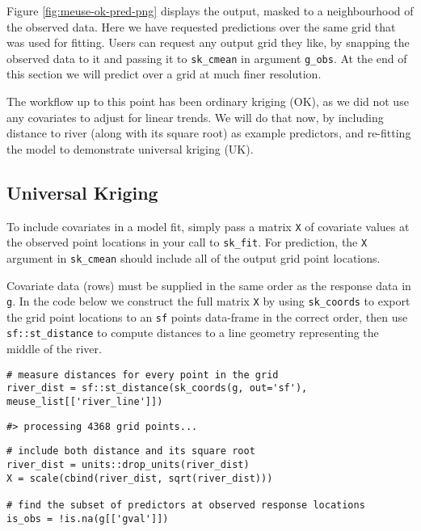 Figure \ref{fig:meuse-ok-pred-png} displays the output, masked to a neighbourhood of the observed data. Here we have requested predictions over the same grid that was used for fitting. Users can request any output grid they like, by snapping the observed data to it and passing it to \texttt{sk\_cmean} in argument \texttt{g\_obs}. At the end of this section we will predict over a grid at much finer resolution.

The workflow up to this point has been ordinary kriging (OK), as we did not use any covariates to adjust for linear trends. We will do that now, by including distance to river (along with its square root) as example predictors, and re-fitting the model to demonstrate universal kriging (UK).

\hypertarget{universal-kriging}{%
\subsection{Universal Kriging}\label{universal-kriging}}

To include covariates in a model fit, simply pass a matrix \texttt{X} of covariate values at the observed point locations in your call to \texttt{sk\_fit}. For prediction, the \texttt{X} argument in \texttt{sk\_cmean} should include all of the output grid point locations.

Covariate data (rows) must be supplied in the same order as the response data in \texttt{g}. In the code below we construct the full matrix \texttt{X} by using \texttt{sk\_coords} to export the grid point locations to an \texttt{sf} points data-frame in the correct order, then use \texttt{sf::st\_distance} to compute distances to a line geometry representing the middle of the river.

\begin{verbatim}
# measure distances for every point in the grid
river_dist = sf::st_distance(sk_coords(g, out='sf'), meuse_list[['river_line']])
\end{verbatim}

\begin{verbatim}
#> processing 4368 grid points...
\end{verbatim}

\begin{verbatim}
# include both distance and its square root
river_dist = units::drop_units(river_dist)
X = scale(cbind(river_dist, sqrt(river_dist)))

# find the subset of predictors at observed response locations
is_obs = !is.na(g[['gval']])
\end{verbatim}

